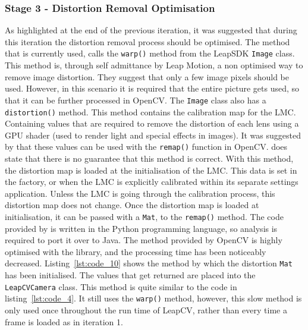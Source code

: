 \documentclass[11pt,oneside]{report}
\newcommand\code[1]{\texttt{#1}}
\begin{document}
		\subsubsection{Stage 3 - Distortion Removal Optimisation}
			As highlighted at the end of the previous iteration, it was suggested that during this iteration the distortion removal process should be optimised.
			The method that is currently used, calls the \code{warp()} method from the LeapSDK \code{Image} class.
			This method is, through self admittance by Leap Motion, a non optimised way to remove image distortion.
			They suggest that only a few image pixels should be used.
			However, in this scenario it is required that the entire picture gets used, so that it can be further processed in OpenCV.
			The \code{Image} class also has a \code{distortion()} method.
			This method contains the calibration map for the LMC.
			Containing values that are required to remove the distortion of each lens using a GPU shader (used to render light and special effects in images).
			It was suggested by  that these values can be used with the \code{remap()} function in OpenCV.
			 does state that there is no guarantee that this method is correct.
			With this method, the distortion map is loaded at the initialisation of the LMC.
			This data is set in the factory, or when the LMC is explicitly calibrated within its separate settings application.
			Unless the LMC is going through the calibration process, this distortion map does not change.
			Once the distortion map is loaded at initialisation, it can be passed with a \code{Mat}, to the \code{remap()} method.
			The code provided by  is written in the Python programming language, so analysis is required to port it over to Java.
			The method provided by OpenCV is highly optimised with the library, and the processing time has been noticeably decreased.
			Listing~\ref{lst:code_10} shows the method by which the distortion \code{Mat} has been initialised.
			The values that get returned are placed into the \code{LeapCVCamera} class.
			This method is quite similar to the code in listing~\ref{lst:code_4}.
			It still uses the \code{warp()} method, however, this slow method is only used once throughout the run time of LeapCV, rather than every time a frame is loaded as in iteration 1.
			
\end{document}
